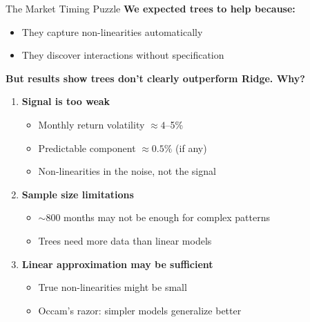 \documentclass[10pt]{beamer}
\begin{document}
\begin{frame}{The Market Timing Puzzle}
  \textbf{We expected trees to help because:}
  \begin{itemize}
    \item They capture non-linearities automatically
    \item They discover interactions without specification
  \end{itemize}

  \vspace{0.5em}
  \textbf{But results show trees don't clearly outperform Ridge. Why?}

  \vspace{0.5em}
  \begin{enumerate}
    \item \textbf{Signal is too weak}
    \begin{itemize}
      \item Monthly return volatility $\approx 4$--5\%
      \item Predictable component $\approx 0.5\%$ (if any)
      \item Non-linearities in the noise, not the signal
    \end{itemize}

    \vspace{0.3em}
    \item \textbf{Sample size limitations}
    \begin{itemize}
      \item $\sim$800 months may not be enough for complex patterns
      \item Trees need more data than linear models
    \end{itemize}

    \vspace{0.3em}
    \item \textbf{Linear approximation may be sufficient}
    \begin{itemize}
      \item True non-linearities might be small
      \item Occam's razor: simpler models generalize better
    \end{itemize}
  \end{enumerate}
\end{frame}

\end{document}
